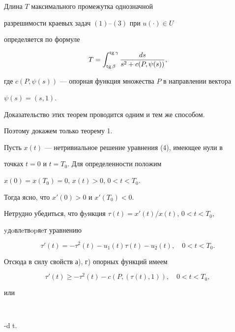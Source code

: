  


\begin{thm} 


Длина $T$ максимального промежутка однозначной 


разрешимости краевых задач $(1)$--$(3)$ при $u(\cdot)\in U$ 


определяется по формуле 


\begin{equation} 


T=\int^{\tg\gamma}_{\tg\beta}\frac{d s}{s^2+c(P,\psi(s))}, 


\end{equation} 


где $c(P,\psi(s))$ --- опорная функция множества $P$ в направлении вектора 


$\psi(s)=(s,1)$. 


\end{thm} 


 


Доказательство этих теорем проводится одним и тем же способом. 


Поэтому докажем только теорему 1. 


 


Пусть $x(t)$ --- нетривиальное решение уравнения (4), имеющее нули в 


точках $t=0$ и $t=T_0$. Для определенности положим 


$x(0)=x(T_0)=0$, $x(t)>0$, $0<t<T_0$. 


Тогда ясно, что $x'(0)>0$ и $x'(T_0)<0$. 


Нетрудно убедиться, что фyнкция $\tau(t)=x'(t)/x(t)$, $0<t<T_0$,


yдoвлeтвopяeт уравнению 


$$ 


\tau'(t)=-\tau^2(t)-u_1(t)\tau(t)-u_2(t),\quad 0<t<T_0. 


$$ 


Отсюда в силу свойств а), г) опорных функций имеем 


\begin{equation} 


\tau'(t)\ge-\tau^2(t)-c(P,(\tau(t),1)),\quad 0<t<T_0, 


\end{equation} 


или 


$$ 


\ge-d t. 


